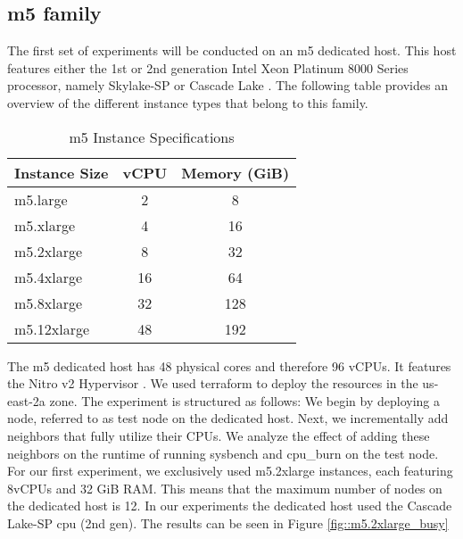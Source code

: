 \subsection{m5 family}
The first set of experiments will be conducted on an m5 dedicated host. This host features either the 1st or 
2nd generation Intel Xeon Platinum 8000 Series processor, namely Skylake-SP or Cascade Lake 
\cite{aws_m5_instances}. The following table provides an overview of the 
different instance types that belong to this family. 
\begin{table}[H]
\centering
\begin{tabular}{lcc}
\hline
\textbf{Instance Size} & \textbf{vCPU} & \textbf{Memory (GiB)} \\
\hline
m5.large     & 2  & 8    \\
m5.xlarge    & 4  & 16   \\
m5.2xlarge   & 8  & 32   \\
m5.4xlarge   & 16 & 64   \\
m5.8xlarge   & 32 & 128  \\
m5.12xlarge  & 48 & 192  \\
\hline
\end{tabular}
\caption{m5 Instance Specifications \cite{aws_m5_instances}}
\end{table}
\noindent
The m5 dedicated host has 48 physical cores and therefore 96 vCPUs. It features the Nitro v2 
Hypervisor \cite{awsEC2GP2025}. We used terraform to deploy the resources in the us-east-2a zone. 
The experiment is structured as follows: We begin by deploying a node, referred to as test node 
on the dedicated host. Next, we incrementally add neighbors that fully utilize their CPUs. 
We analyze the effect of adding these neighbors on the runtime of running sysbench and cpu\_burn on the test 
node.
For our first experiment, we exclusively used m5.2xlarge instances, each featuring 8vCPUs and 32 GiB RAM. 
This means that the maximum number of nodes on the dedicated host is 12. In our experiments the dedicated host used the Cascade Lake-SP cpu (2nd gen). The results can 
be seen in Figure \ref{fig::m5.2xlarge_busy}

